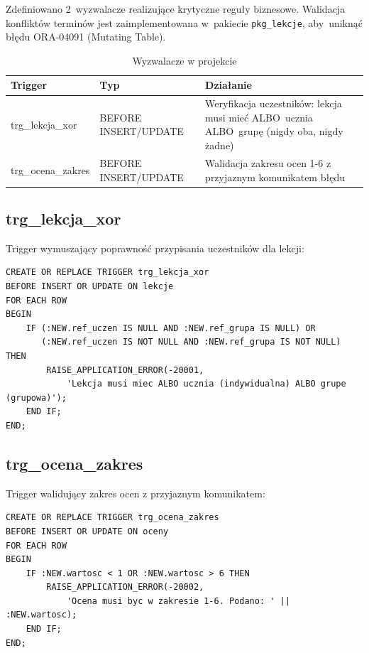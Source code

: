 \documentclass[12pt,a4paper]{article}
\begin{document}
Zdefiniowano 2~wyzwalacze realizujące krytyczne reguły biznesowe. Walidacja konfliktów terminów jest zaimplementowana w~pakiecie \texttt{pkg\_lekcje}, aby~uniknąć błędu ORA-04091 (Mutating Table).

\begin{table}[h]
\centering
\small
\begin{tabular}{|l|l|p{6cm}|}
\hline
\textbf{Trigger} & \textbf{Typ} & \textbf{Działanie} \\
\hline
trg\_lekcja\_xor & BEFORE INSERT/UPDATE & Weryfikacja uczestników: lekcja musi mieć ALBO~ucznia ALBO~grupę (nigdy oba, nigdy żadne) \\
\hline
trg\_ocena\_zakres & BEFORE INSERT/UPDATE & Walidacja zakresu ocen 1-6 z przyjaznym komunikatem błędu \\
\hline
\end{tabular}
\caption{Wyzwalacze w projekcie}
\end{table}

\subsection{trg\_lekcja\_xor}

Trigger wymuszający poprawność przypisania uczestników dla lekcji:

\begin{verbatim}
CREATE OR REPLACE TRIGGER trg_lekcja_xor
BEFORE INSERT OR UPDATE ON lekcje
FOR EACH ROW
BEGIN
    IF (:NEW.ref_uczen IS NULL AND :NEW.ref_grupa IS NULL) OR
       (:NEW.ref_uczen IS NOT NULL AND :NEW.ref_grupa IS NOT NULL) THEN
        RAISE_APPLICATION_ERROR(-20001,
            'Lekcja musi miec ALBO ucznia (indywidualna) ALBO grupe (grupowa)');
    END IF;
END;
\end{verbatim}

\subsection{trg\_ocena\_zakres}

Trigger walidujący zakres ocen z przyjaznym komunikatem:

\begin{verbatim}
CREATE OR REPLACE TRIGGER trg_ocena_zakres
BEFORE INSERT OR UPDATE ON oceny
FOR EACH ROW
BEGIN
    IF :NEW.wartosc < 1 OR :NEW.wartosc > 6 THEN
        RAISE_APPLICATION_ERROR(-20002,
            'Ocena musi byc w zakresie 1-6. Podano: ' || :NEW.wartosc);
    END IF;
END;
\end{verbatim}
\end{document}
